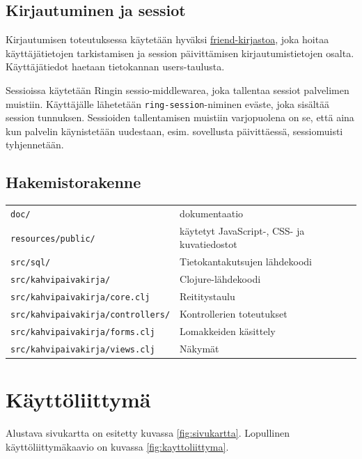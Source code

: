 \documentclass[a4paper,titlepage]{article}
\begin{document}
\subsection{Kirjautuminen ja sessiot}

Kirjautumisen toteutuksessa käytetään hyväksi
\href{https://github.com/cemerick/friend}{friend-kirjastoa}, joka
hoitaa käyttäjätietojen tarkistamisen ja session päivittämisen
kirjautumistietojen osalta. Käyttäjätiedot haetaan tietokannan
users-taulusta.

Sessioissa käytetään Ringin sessio-middlewarea, joka tallentaa sessiot
palvelimen muistiin. Käyttäjälle lähetetään
\texttt{ring-session}-niminen eväste, joka sisältää session
tunnuksen. Sessioiden tallentamisen muistiin varjopuolena on se, että
aina kun palvelin käynistetään uudestaan, esim. sovellusta
päivittäessä, sessiomuisti tyhjennetään.


\subsection{Hakemistorakenne}

\begin{center}
\begin{tabularx}{\textwidth}{|X|X|}
\hline
\texttt{doc/} & dokumentaatio \\
\texttt{resources/public/} & käytetyt JavaScript-, CSS- ja kuvatiedostot \\
\texttt{src/sql/} & Tietokantakutsujen lähdekoodi \\
\texttt{src/kahvipaivakirja/} & Clojure-lähdekoodi \\
\texttt{src/kahvipaivakirja/core.clj} & Reititystaulu \\
\texttt{src/kahvipaivakirja/controllers/} & Kontrollerien toteutukset \\
\texttt{src/kahvipaivakirja/forms.clj} & Lomakkeiden käsittely \\
\texttt{src/kahvipaivakirja/views.clj} & Näkymät \\
\hline
\end{tabularx}
\end{center}


\section{Käyttöliittymä}

Alustava sivukartta on esitetty kuvassa
\ref{fig:sivukartta}. Lopullinen käyttöliittymäkaavio on kuvassa
\ref{fig:kayttoliittyma}.
\end{document}
